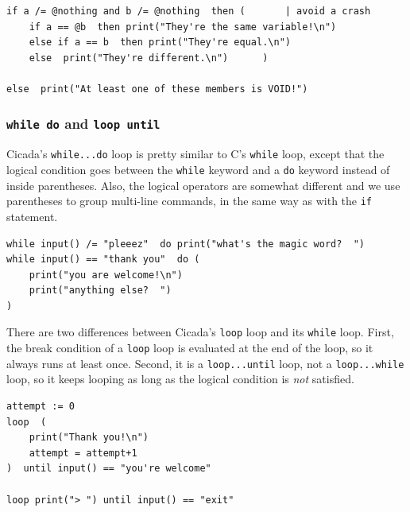 \documentclass{article}
\newenvironment{code}{
       \begin{list}{}{
               \setlength{\leftmargin}{.4in}
               \setlength{\rightmargin}{0in}
               \setlength{\topsep}{.2in}
       }
       \small
       \item[] }
       { \end{list}   }
\begin{document}
\begin{code} \begin{verbatim}
if a /= @nothing and b /= @nothing  then (       | avoid a crash
    if a == @b  then print("They're the same variable!\n")
    else if a == b  then print("They're equal.\n")
    else  print("They're different.\n")      )

else  print("At least one of these members is VOID!")
\end{verbatim} \end{code}




\subsubsection{\texttt{while do} and \texttt{loop until}}   

Cicada's \verb#while...do# loop is pretty similar to C's \verb#while# loop, except that the logical condition goes between the \verb#while# keyword and a \verb#do# keyword instead of inside parentheses.  Also, the logical operators are somewhat different and we use parentheses to group multi-line commands, in the same way as with the \texttt{if} statement.

\begin{code} \begin{verbatim}
while input() /= "pleeez"  do print("what's the magic word?  ")
while input() == "thank you"  do (
    print("you are welcome!\n")
    print("anything else?  ")
)
\end{verbatim} \end{code}

There are two differences between Cicada's \texttt{loop} loop and its \verb#while# loop.  First, the break condition of a \texttt{loop} loop is evaluated at the end of the loop, so it always runs at least once.  Second, it is a \verb#loop...until# loop, not a \verb#loop...while# loop, so it keeps looping as long as the logical condition is \emph{not} satisfied.

\begin{code} \begin{verbatim}
attempt := 0
loop  (
    print("Thank you!\n")
    attempt = attempt+1
)  until input() == "you're welcome"

loop print("> ") until input() == "exit"
\end{verbatim} \end{code}
\end{document}
